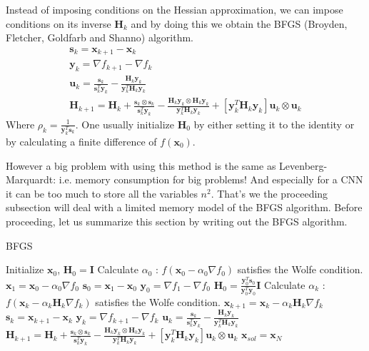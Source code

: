 \documentclass[a4paper,10pt]{article}
\theoremstyle{definition}
\begin{document}
Instead of imposing conditions on the Hessian approximation, we can impose conditions on its inverse $\pmb{H}_k$ and by doing this we obtain the BFGS (Broyden, Fletcher, Goldfarb and Shanno) algorithm.
\begin{gather}
	\pmb{s}_k = \pmb{x}_{k+1} - \pmb{x}_{k}\\
	\pmb{y}_k = \nabla f_{k+1} - \nabla f_k\\
	\pmb{u}_k = \frac{\pmb{s}_k}{\pmb{s}_k^T \pmb{y}_k} - \frac{\pmb{H}_k \pmb{y}_k}{\pmb{y}_k^T \pmb{H}_k \pmb{y}_k}\\
	\pmb{H}_{k+1} = \pmb{H}_k + \frac{\pmb{s}_k \otimes \pmb{s}_k}{\pmb{s}_k^T \pmb{y}_k} - \frac{\pmb{H}_k\pmb{y}_k \otimes \pmb{H}_k\pmb{y}_k}{\pmb{y}_k^T \pmb{H}_k\pmb{y}_k} + [\pmb{y}_k^T \pmb{H}_k\pmb{y}_k] \pmb{u}_k \otimes \pmb{u}_k
\end{gather}
Where $\rho_k = \frac{1}{\pmb{y}_k^T\pmb{s}_k}$. One usually initialize $\pmb{H}_0$ by either setting it to the identity or by calculating a finite difference of $f(\pmb{x}_0)$.

However a big problem with using this method is the same as Levenberg-Marquardt: i.e. memory consumption for big problems! And especially for a CNN it can be too much to store all the variables $n^2$. That's we the proceeding subsection will deal with a limited memory model of the BFGS algorithm. Before proceeding, let us summarize this section by writing out the BFGS algorithm.\\
\begin{algorithm}[H]
	\DontPrintSemicolon
	\caption{BFGS}
	Initialize $\pmb{x}_0$, $\pmb{H}_0 = \pmb{I}$\;
	Calculate $\alpha_0$ : $f(\pmb{x}_0 - \alpha_0 \nabla f_0)$ satisfies the Wolfe condition. \;
	$\pmb{x}_1 = \pmb{x}_0 - \alpha_0 \nabla f_0$\;
	$\pmb{s}_0 = \pmb{x}_1 - \pmb{x}_0$\;
	$\pmb{y}_0 = \nabla f_1 - \nabla f_0$\;
	$\pmb{H}_0 = \frac{\pmb{y}_0^T \pmb{s}_0}{\pmb{y}_0^T\pmb{y}_0} \pmb{I}$\;
	{
		Calculate $\alpha_k$ : $f(\pmb{x}_k - \alpha_k \pmb{H}_k \nabla f_k)$ satisfies the Wolfe condition. \;
		$\pmb{x}_{k+1} = \pmb{x}_k - \alpha_k \pmb{H}_k \nabla f_k$\;
		$\pmb{s}_k = \pmb{x}_{k+1} - \pmb{x}_k$\;
		$\pmb{y}_k = \nabla f_{k+1} - \nabla f_k$\;
		$\pmb{u}_k = \frac{\pmb{s}_k}{\pmb{s}_k^T \pmb{y}_k} - \frac{\pmb{H}_k \pmb{y}_k}{\pmb{y}_k^T \pmb{H}_k \pmb{y}_k}$\;
		$\pmb{H}_{k+1} = \pmb{H}_k + \frac{\pmb{s}_k \otimes \pmb{s}_k}{\pmb{s}_k^T \pmb{y}_k} - \frac{\pmb{H}_k\pmb{y}_k \otimes \pmb{H}_k\pmb{y}_k}{\pmb{y}_k^T \pmb{H}_k\pmb{y}_k} + [\pmb{y}_k^T \pmb{H}_k\pmb{y}_k] \pmb{u}_k \otimes \pmb{u}_k$ \;
	}
	\;
	$\pmb{x}_{sol	} = \pmb{x}_{N}$\;
\end{algorithm}
\end{document}
